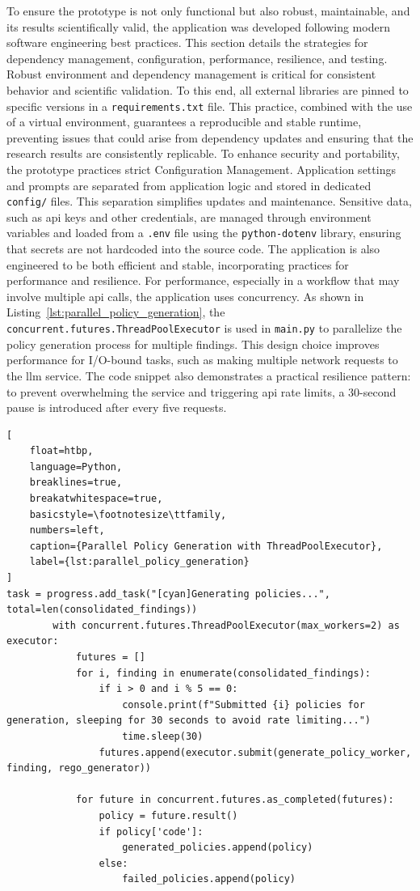 To ensure the prototype is not only functional but also robust, maintainable, and its results scientifically valid, the application was developed following modern software engineering best practices. This section details the strategies for dependency management, configuration, performance, resilience, and testing.
Robust environment and dependency management is critical for consistent behavior and scientific validation. To this end, all external libraries are pinned to specific versions in a \texttt{requirements.txt} file. This practice, combined with the use of a virtual environment, guarantees a reproducible and stable runtime, preventing issues that could arise from dependency updates and ensuring that the research results are consistently replicable.
To enhance security and portability, the prototype practices strict Configuration Management. Application settings and prompts are separated from application logic and stored in dedicated \texttt{config/} files. This separation simplifies updates and maintenance. Sensitive data, such as \gls{api} keys and other credentials, are managed through environment variables and loaded from a \texttt{.env} file using the \texttt{python-dotenv} library, ensuring that secrets are not hardcoded into the source code.
The application is also engineered to be both efficient and stable, incorporating practices for performance and resilience. For performance, especially in a workflow that may involve multiple \gls{api} calls, the application uses concurrency. As shown in Listing~\ref{lst:parallel_policy_generation}, the \texttt{concurrent.futures.ThreadPoolExecutor} is used in \texttt{main.py} to parallelize the policy generation process for multiple findings. This design choice improves performance for I/O-bound tasks, such as making multiple network requests to the \gls{llm} service. The code snippet also demonstrates a practical resilience pattern: to prevent overwhelming the service and triggering \gls{api} rate limits, a 30-second pause is introduced after every five requests.
\begin{lstlisting}[
    float=htbp,
    language=Python, 
    breaklines=true, 
    breakatwhitespace=true,
    basicstyle=\footnotesize\ttfamily, 
    numbers=left,
    caption={Parallel Policy Generation with ThreadPoolExecutor},
    label={lst:parallel_policy_generation}
]
task = progress.add_task("[cyan]Generating policies...", total=len(consolidated_findings))
        with concurrent.futures.ThreadPoolExecutor(max_workers=2) as executor:
            futures = []
            for i, finding in enumerate(consolidated_findings):
                if i > 0 and i % 5 == 0:
                    console.print(f"Submitted {i} policies for generation, sleeping for 30 seconds to avoid rate limiting...")
                    time.sleep(30)
                futures.append(executor.submit(generate_policy_worker, finding, rego_generator))

            for future in concurrent.futures.as_completed(futures):
                policy = future.result()
                if policy['code']:
                    generated_policies.append(policy)
                else:
                    failed_policies.append(policy)
\end{lstlisting}

